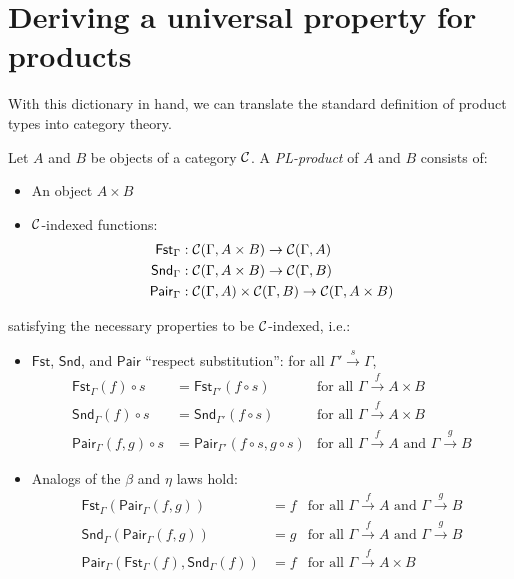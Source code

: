 \section{Deriving a universal property for products}

With this dictionary in hand, we can translate the standard definition of product types into category theory.

\begin{definition}[PL-product]
  \sloppy
  Let \(A\) and \(B\) be objects of a category \(\mathcal C\).
  A \emph{PL-product} of \(A\) and \(B\) consists of:
  \begin{itemize}
  \item An object \(A \times B\)
  \item $\mathcal C$-indexed functions:
    \begin{align*}
      \mathsf{Fst}_\Gamma &: \mathcal C(\Gamma,A\times B) \to \mathcal C(\Gamma,A) \\
      \mathsf{Snd}_\Gamma &: \mathcal C(\Gamma,A\times B) \to \mathcal C(\Gamma,B) \\
      \mathsf{Pair}_\Gamma &: \mathcal C(\Gamma,A)\times\mathcal C(\Gamma,B) \to \mathcal C(\Gamma,A\times B)
    \end{align*}
  \end{itemize}
  satisfying the necessary properties to be $\mathcal C$-indexed, i.e.: 
  \begin{itemize}
  \item \(\mathsf{Fst}\), \(\mathsf{Snd}\), and \(\mathsf{Pair}\) ``respect substitution'': for all
    \(\Gamma'\xrightarrow{s}\Gamma\),
    \begin{align*}
      \mathsf{Fst}_{\Gamma}(f)\circ s &= \mathsf{Fst}_{\Gamma'}(f \circ s) & \text{for all \(\Gamma\xrightarrow{f} A \times B\)} \\
      \mathsf{Snd}_{\Gamma}(f)\circ s &= \mathsf{Snd}_{\Gamma'}(f \circ s) & \text{for all \(\Gamma\xrightarrow{f} A \times B\)} \\
      \mathsf{Pair}_{\Gamma}(f,g)\circ s &= \mathsf{Pair}_{\Gamma'}(f \circ s,g\circ s) & \text{for all \(\Gamma\xrightarrow{f} A\) and \(\Gamma\xrightarrow{g} B\)}
    \end{align*}
  \item Analogs of the \(\beta\) and \(\eta\) laws hold:
    \begin{align*}
      \mathsf{Fst}_{\Gamma}(\mathsf{Pair}_{\Gamma}(f,g)) &= f   & \text{for all \(\Gamma\xrightarrow{f} A\) and \(\Gamma\xrightarrow{g} B\)} \\
      \mathsf{Snd}_{\Gamma}(\mathsf{Pair}_{\Gamma}(f,g)) &= g   & \text{for all \(\Gamma\xrightarrow{f} A\) and \(\Gamma\xrightarrow{g} B\)} \\
      \mathsf{Pair}_\Gamma(\mathsf{Fst}_\Gamma(f),\mathsf{Snd}_\Gamma(f)) &= f   & \text{for all \(\Gamma\xrightarrow{f} A\times B\)}
    \end{align*}
  \end{itemize}
\end{definition}

